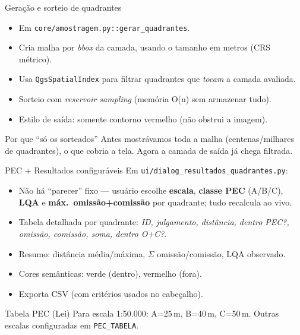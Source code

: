 \documentclass[10pt,aspectratio=169]{beamer}
\begin{document}
\begin{frame}{Geração e sorteio de quadrantes}
  \begin{itemize}
    \item Em \texttt{core/amostragem.py::gerar\_quadrantes}.
    \item Cria malha por \emph{bbox} da camada, usando o tamanho em metros (CRS métrico).
    \item Usa \texttt{QgsSpatialIndex} para filtrar quadrantes que \emph{tocam} a camada avaliada.
    \item Sorteio com \emph{reservoir sampling} (memória O(n) sem armazenar tudo).
    \item Estilo de saída: somente contorno vermelho (não obstrui a imagem).
  \end{itemize}
  \begin{block}{Por que ``só os sorteados''}
    Antes mostrávamos toda a malha (centenas/milhares de quadrantes), o que cobria a tela. Agora a camada de saída já chega filtrada.
  \end{block}
\end{frame}

\begin{frame}{PEC + Resultados configuráveis}
  Em \texttt{ui/dialog\_resultados\_quadrantes.py}:
  \begin{itemize}
    \item Não há ``parecer'' fixo — usuário escolhe \textbf{escala}, \textbf{classe PEC} (A/B/C), \textbf{LQA} e \textbf{máx.~omissão+comissão} por quadrante; tudo recalcula ao vivo.
    \item Tabela detalhada por quadrante: \emph{ID, julgamento, distância, dentro PEC?, omissão, comissão, soma, dentro O+C?}.
    \item Resumo: distância média/máxima, $\Sigma$ omissão/comissão, LQA observado.
    \item Cores semânticas: verde (dentro), vermelho (fora).
    \item Exporta CSV (com critérios usados no cabeçalho).
  \end{itemize}
  \begin{exampleblock}{Tabela PEC (Lei)}
    Para escala 1:50.000: A=25\,m, B=40\,m, C=50\,m. Outras escalas configuradas em \texttt{PEC\_TABELA}.
  \end{exampleblock}
\end{frame}
\end{document}
